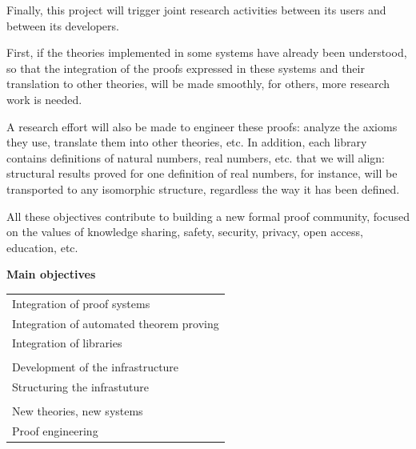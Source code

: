 Finally, this project will trigger joint research activities between
its users and between its developers.  

First, if the theories implemented in some systems have already been
understood, so that the integration of the proofs expressed in these
systems and their translation to other theories, will be made
smoothly, for others, more research work is needed. 

A research effort will also be made to engineer these proofs: analyze
the axioms they use, translate them into other theories, etc.  In
addition, each library contains definitions of natural numbers, real
numbers, etc. that we will align: structural results proved for one
definition of real numbers, for instance, will be transported to any
isomorphic structure, regardless the way it has been defined.

All these objectives contribute to building a new formal proof
community, focused on the values of
knowledge sharing, safety, security, privacy, open access, education, etc.

\newpage

\begin{framed}
\begin{center}
{\bf Main objectives}
\end{center}

\begin{tabular}{l}
  Integration of proof systems\\
  Integration of automated theorem proving\\
  Integration of libraries\\
  \\
  Development of the infrastructure\\
  Structuring the infrastuture\\
  \\
  New theories, new systems\\
  Proof engineering\\
\end{tabular}
\end{framed}


